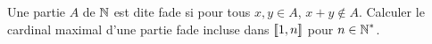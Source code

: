 \begin{exo}
    \label{misc1}
    Une partie $A$ de $\operatorname{\mathbb N}$ est dite fade si pour tous $x,y\in A$, $x+y\notin A$.
    Calculer le cardinal maximal d'une partie fade incluse dans $[\![1,n]\!]$ pour $n\in\operatorname{\mathbb N}^*$.
\end{exo}

\begin{solution}


\end{solution}
